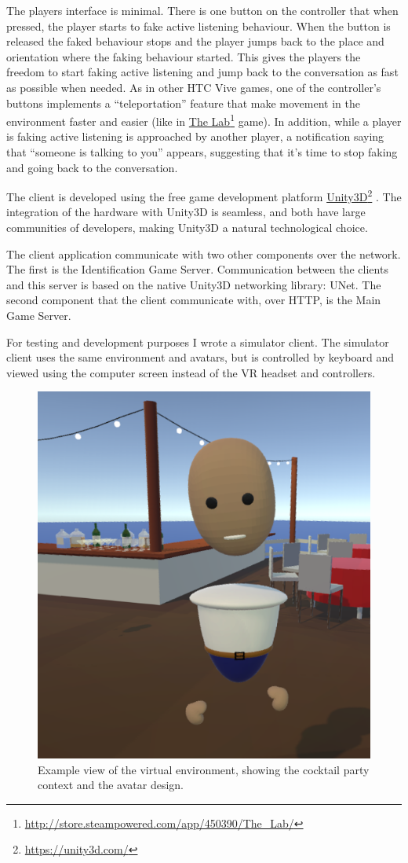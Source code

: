 \documentclass[]{simple-thesis}
\newcommand\fnurl[2]{%
  \href{#2}{#1}\footnote{\url{#2}}%
}
\begin{document}
The players interface is minimal.
There is one button on the controller that when pressed, the player starts to fake active listening behaviour.
When the button is released the faked behaviour stops and the player jumps back to the place and orientation where the faking behaviour started.
This gives the players the freedom to start faking active listening and jump back to the conversation as fast as possible when needed.
As in other HTC Vive games, one of the controller's buttons implements a ``teleportation'' feature that make movement in the environment faster and easier (like in \fnurl{The Lab}{http://store.steampowered.com/app/450390/The_Lab/} game).
In addition, while a player is faking active listening is approached by another player, a notification saying that ``someone is talking to you'' appears, suggesting that it's time to stop faking and going back to the conversation.

The client is developed using the free game development platform \fnurl{Unity3D}{https://unity3d.com/}.
The integration of the hardware with Unity3D is seamless, and both have large communities of developers, making Unity3D a natural technological choice.

The client application communicate with two other components over the network.
The first is the Identification Game Server.
Communication between the clients and this server is based on the native Unity3D networking library: UNet.
The second component that the client communicate with, over HTTP, is the Main Game Server.

For testing and development purposes I wrote a simulator client.
The simulator client uses the same environment and avatars, but is controlled by keyboard and viewed using the computer screen instead of the VR headset and controllers.

\begin{figure}
  \centering
  \includegraphics[width=.5\textwidth]{../graphics/environment_demo.png}
  \caption{Example view of the virtual environment, showing the cocktail party context and the avatar design.}
  \label{fig:system:environment_demo}
\end{figure}
\end{document}
